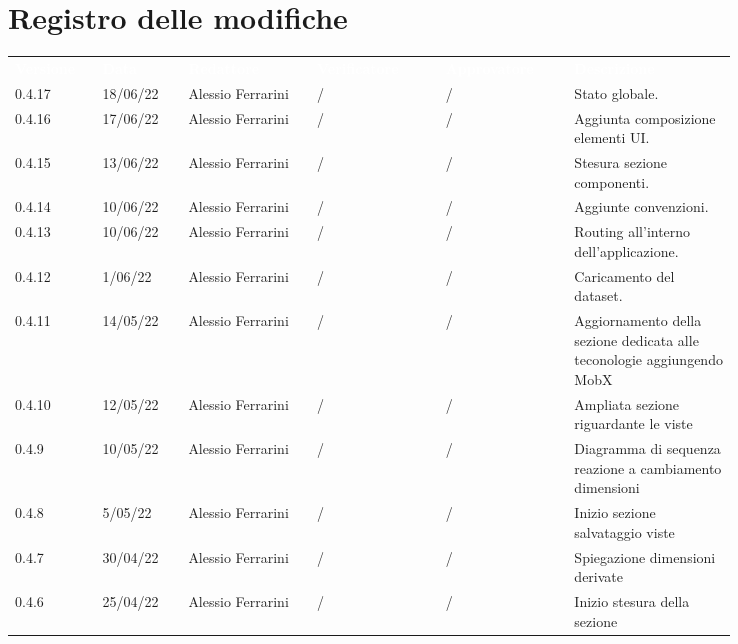 \section*{Registro delle modifiche}

{\renewcommand{\arraystretch}{1.5}
\scriptsize
\begin{tabular}{p{0.10\linewidth}p{0.10\linewidth}p{0.15\linewidth}p{0.15\linewidth}p{0.15\linewidth}p{0.19\linewidth}}
	\rowcolor[RGB]{33, 73, 50}
	\textcolor{white}{\textbf{Versione}} & \textcolor{white}{\textbf{Data}} &
	\textcolor{white}{\textbf{Redattore}} & \textcolor{white}{\textbf{Verificatore}} &
	\textcolor{white}{\textbf{Approvatore}} & \textcolor{white}{\textbf{Descrizione}}\\
	\rowcolor[RGB]{216, 235, 171}
	0.4.17 & 18/06/22 & Alessio Ferrarini & / & / & Stato globale. \\
	\rowcolor[RGB]{233, 245, 206}
	0.4.16 & 17/06/22 & Alessio Ferrarini & / & / & Aggiunta composizione elementi UI.\\
	\rowcolor[RGB]{216, 235, 171}
	0.4.15 & 13/06/22 & Alessio Ferrarini & / & / & Stesura sezione componenti. \\
	\rowcolor[RGB]{233, 245, 206}
	0.4.14 & 10/06/22 & Alessio Ferrarini & / & / & Aggiunte convenzioni.\\
	\rowcolor[RGB]{216, 235, 171}
	0.4.13 & 10/06/22 & Alessio Ferrarini & / & / & Routing all'interno dell'applicazione. \\
	\rowcolor[RGB]{233, 245, 206}
	0.4.12 & 1/06/22 & Alessio Ferrarini & / & / & Caricamento del dataset.\\
	\rowcolor[RGB]{216, 235, 171}
	0.4.11 & 14/05/22 & Alessio Ferrarini & / & / & Aggiornamento della sezione
  dedicata alle teconologie aggiungendo MobX \\
	\rowcolor[RGB]{233, 245, 206}
	0.4.10 & 12/05/22 & Alessio Ferrarini & / & / & Ampliata sezione riguardante le
  viste \\
	\rowcolor[RGB]{216, 235, 171}
	0.4.9 & 10/05/22 & Alessio Ferrarini & / & / & Diagramma di sequenza reazione
  a cambiamento dimensioni \\
	\rowcolor[RGB]{233, 245, 206}
	0.4.8 & 5/05/22 & Alessio Ferrarini & / & / & Inizio sezione salvataggio
  viste \\
	\rowcolor[RGB]{216, 235, 171}
	0.4.7 & 30/04/22 & Alessio Ferrarini & / & / & Spiegazione dimensioni derivate
  \\
	\rowcolor[RGB]{233, 245, 206}
	0.4.6 & 25/04/22 & Alessio Ferrarini & / & / & Inizio stesura della sezione

\end{tabular}}
